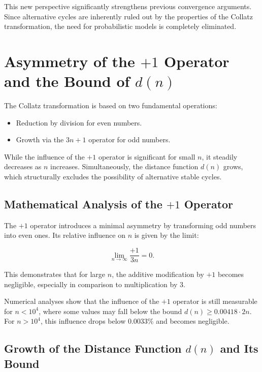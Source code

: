\documentclass[a4paper,12pt]{article}
\begin{document}
This new perspective significantly strengthens previous convergence arguments. Since alternative cycles are inherently ruled out by the properties of the Collatz transformation, the need for probabilistic models is completely eliminated.






\section{Asymmetry of the \( +1 \) Operator and the Bound of \( d(n) \)}

The Collatz transformation is based on two fundamental operations:

\begin{itemize}
    \item Reduction by division for even numbers.
    \item Growth via the \( 3n+1 \) operator for odd numbers.
\end{itemize}

While the influence of the \( +1 \) operator is significant for small \( n \), it steadily decreases as \( n \) increases. Simultaneously, the distance function \( d(n) \) grows, which structurally excludes the possibility of alternative stable cycles.

\subsection{Mathematical Analysis of the \( +1 \) Operator}

The \( +1 \) operator introduces a minimal asymmetry by transforming odd numbers into even ones. Its relative influence on \( n \) is given by the limit:

\begin{equation} 
    \lim_{n \to \infty} \frac{+1}{3n} = 0.
\end{equation}

This demonstrates that for large \( n \), the additive modification by \( +1 \) becomes negligible, especially in comparison to multiplication by 3.

Numerical analyses show that the influence of the \( +1 \) operator is still measurable for \( n < 10^4 \), where some values may fall below the bound \( d(n) \geq 0.00418 \cdot 2n \). For \( n > 10^4 \), this influence drops below 0.0033\% and becomes negligible.

\subsection{Growth of the Distance Function \( d(n) \) and Its Bound}
\end{document}
